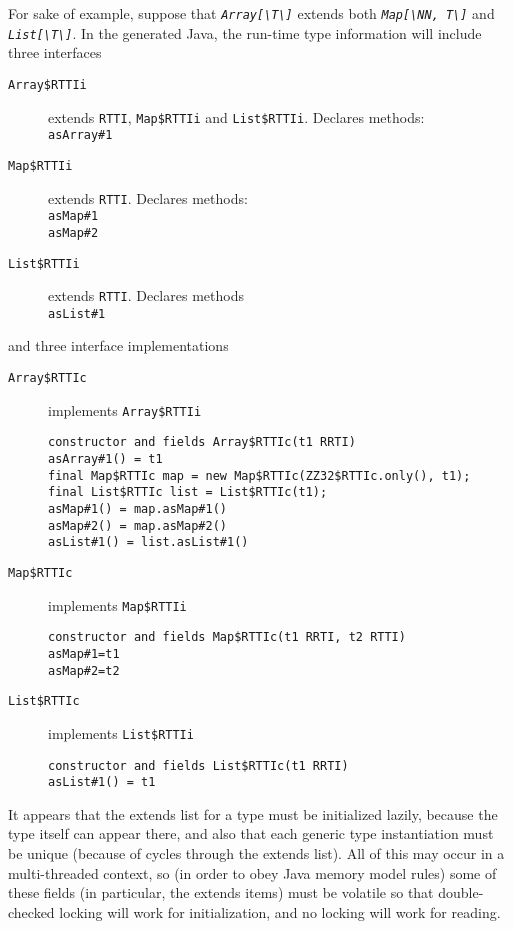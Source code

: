 \documentclass[11pt]{article}
\newcommand{\jvm}[1]{{\tt #1}}
\newcommand{\ftt}[1]{{\tt\slshape{#1}}}
\def\BS{\textbackslash}
\begin{document}
For sake of example, suppose that \ftt{Array[\BS T\BS]} extends both \ftt{Map[\BS NN, T\BS]} and \ftt{List[\BS T\BS]}.  In the generated Java, the run-time type information will include three interfaces
\begin{description}
\item[\jvm{Array\$RTTIi}] extends \jvm{RTTI}, \jvm{Map\$RTTIi} and \jvm{List\$RTTIi}. Declares methods:\\
\jvm{asArray\#1}
\item[\jvm{Map\$RTTIi}] extends \jvm{RTTI}.  Declares methods:\\
\jvm{asMap\#1}\\
\jvm{asMap\#2}
\item[\jvm{List\$RTTIi}] extends \jvm{RTTI}.  Declares methods\\
\jvm{asList\#1}
\end{description}

and three interface implementations
\begin{description}
\item[\jvm{Array\$RTTIc}] implements \jvm{Array\$RTTIi}
{
\begin{verbatim}
constructor and fields Array$RTTIc(t1 RRTI)
asArray#1() = t1
final Map$RTTIc map = new Map$RTTIc(ZZ32$RTTIc.only(), t1);
final List$RTTIc list = List$RTTIc(t1);
asMap#1() = map.asMap#1()
asMap#2() = map.asMap#2()
asList#1() = list.asList#1()
\end{verbatim}
}
\item[\jvm{Map\$RTTIc}] implements \jvm{Map\$RTTIi}
{
\begin{verbatim}
constructor and fields Map$RTTIc(t1 RRTI, t2 RTTI)
asMap#1=t1
asMap#2=t2
\end{verbatim}
}
\item[\jvm{List\$RTTIc}] implements \jvm{List\$RTTIi}
{
\begin{verbatim}
constructor and fields List$RTTIc(t1 RRTI)
asList#1() = t1
\end{verbatim}
}
\end{description}

It appears that the extends list for a type must be initialized lazily, because the type itself can appear there, and also that each generic type instantiation must be unique (because of cycles through the extends list).  All of this may occur in a multi-threaded context, so (in order to obey Java memory model rules) some of these fields (in particular, the extends items) must be volatile so that double-checked locking will work for initialization, and no locking will work for reading.
\end{document}
